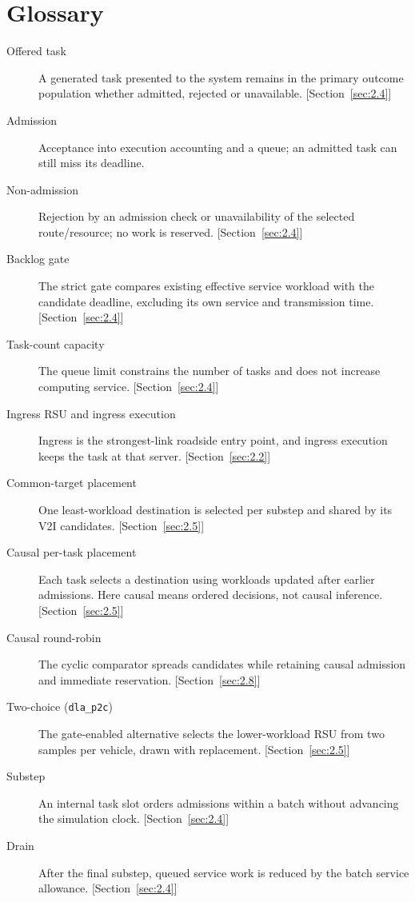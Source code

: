 \documentclass[12pt,a4paper]{article}
\begin{document}
\section*{Glossary}
{\small\singlespacing
\begin{description}
\item[Offered task] A generated task presented to the system remains in the primary outcome population whether admitted, rejected or unavailable. [Section~\ref{sec:2.4}]
\item[Admission] Acceptance into execution accounting and a queue; an admitted task can still miss its deadline.\item[Non-admission] Rejection by an admission check or unavailability of the selected route/resource; no work is reserved. [Section~\ref{sec:2.4}]
\item[Backlog gate] The strict gate compares existing effective service workload with the candidate deadline, excluding its own service and transmission time. [Section~\ref{sec:2.4}]
\item[Task-count capacity] The queue limit constrains the number of tasks and does not increase computing service. [Section~\ref{sec:2.4}]
\item[Ingress RSU and ingress execution] Ingress is the strongest-link roadside entry point, and ingress execution keeps the task at that server. [Section~\ref{sec:2.2}]
\item[Common-target placement] One least-workload destination is selected per substep and shared by its V2I candidates. [Section~\ref{sec:2.5}]
\item[Causal per-task placement] Each task selects a destination using workloads updated after earlier admissions. Here causal means ordered decisions, not causal inference. [Section~\ref{sec:2.5}]
\item[Causal round-robin] The cyclic comparator spreads candidates while retaining causal admission and immediate reservation. [Section~\ref{sec:2.8}]
\item[Two-choice (\texttt{dla\_p2c})] The gate-enabled alternative selects the lower-workload RSU from two samples per vehicle, drawn with replacement. [Section~\ref{sec:2.5}]
\item[Substep] An internal task slot orders admissions within a batch without advancing the simulation clock. [Section~\ref{sec:2.4}]
\item[Drain] After the final substep, queued service work is reduced by the batch service allowance. [Section~\ref{sec:2.4}]

\end{description}}
\end{document}
